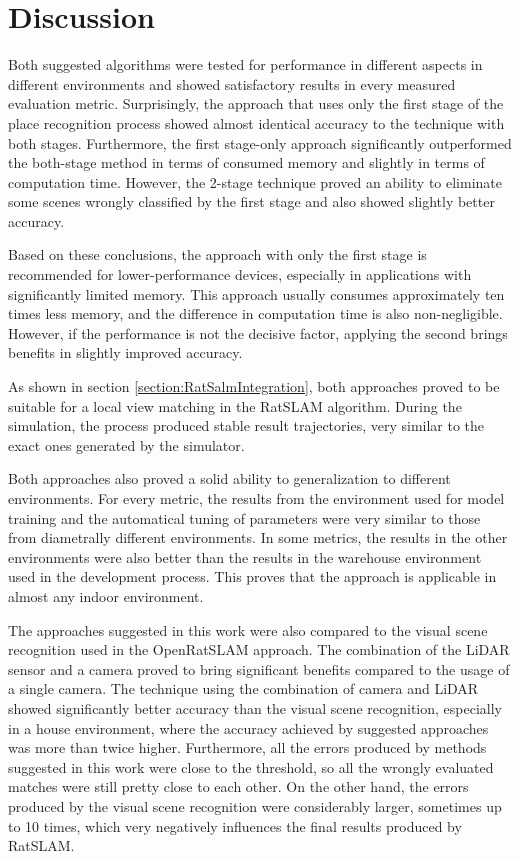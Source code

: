 \section{Discussion}\label{section:Discussion}

Both suggested algorithms were tested for performance in different aspects in different environments and showed satisfactory results in every measured evaluation metric. Surprisingly, the approach that uses only the first stage of the place recognition process showed almost identical accuracy to the technique with both stages. Furthermore, the first stage-only approach significantly outperformed the both-stage method in terms of consumed memory and slightly in terms of computation time. However, the 2-stage technique proved an ability to eliminate some scenes wrongly classified by the first stage and also showed slightly better accuracy.\par
Based on these conclusions, the approach with only the first stage is recommended for lower-performance devices, especially in applications with significantly limited memory. This approach usually consumes approximately ten times less memory, and the difference in computation time is also non-negligible. However, if the performance is not the decisive factor, applying the second brings benefits in slightly improved accuracy.\par
As shown in section \ref{section:RatSalmIntegration}, both approaches proved to be suitable for a local view matching in the RatSLAM algorithm. During the simulation, the process produced stable result trajectories, very similar to the exact ones generated by the simulator.\par
Both approaches also proved a solid ability to generalization to different environments. For every metric, the results from the environment used for model training and the automatical tuning of parameters were very similar to those from diametrally different environments. In some metrics, the results in the other environments were also better than the results in the warehouse environment used in the development process. This proves that the approach is applicable in almost any indoor environment.\par
The approaches suggested in this work were also compared to the visual scene recognition used in the OpenRatSLAM approach. The combination of the LiDAR sensor and a camera proved to bring significant benefits compared to the usage of a single camera. The technique using the combination of camera and LiDAR showed significantly better accuracy than the visual scene recognition, especially in a house environment, where the accuracy achieved by suggested approaches was more than twice higher. Furthermore, all the errors produced by methods suggested in this work were close to the threshold, so all the wrongly evaluated matches were still pretty close to each other. On the other hand, the errors produced by the visual scene recognition were considerably larger, sometimes up to 10 times, which very negatively influences the final results produced by RatSLAM.\par
